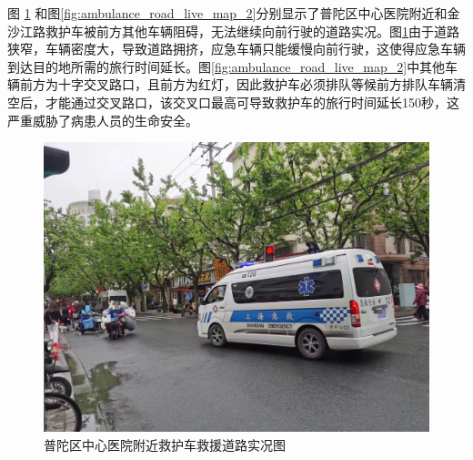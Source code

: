 
图 \ref{fig:ambulance_road_live_map_1} 和图\ref{fig:ambulance_road_live_map_2}分别显示了普陀区中心医院附近和金沙江路救护车被前方其他车辆阻碍，无法继续向前行驶的道路实况。图\ref{fig:ambulance_road_live_map_1}由于道路狭窄，车辆密度大，导致道路拥挤，应急车辆只能缓慢向前行驶，这使得应急车辆到达目的地所需的旅行时间延长。图\ref{fig:ambulance_road_live_map_2}中其他车辆前方为十字交叉路口，且前方为红灯，因此救护车必须排队等候前方排队车辆清空后，才能通过交叉路口，该交叉口最高可导致救护车的旅行时间延长150秒，这严重威胁了病患人员的生命安全。

 \begin{figure}[ht]
	\centering
	\includegraphics[width=\textwidth]{figures/ambulance_road_live_map_1.jpg}
	\caption{普陀区中心医院附近救护车救援道路实况图}
	\label{fig:ambulance_road_live_map_1}
\end{figure}

